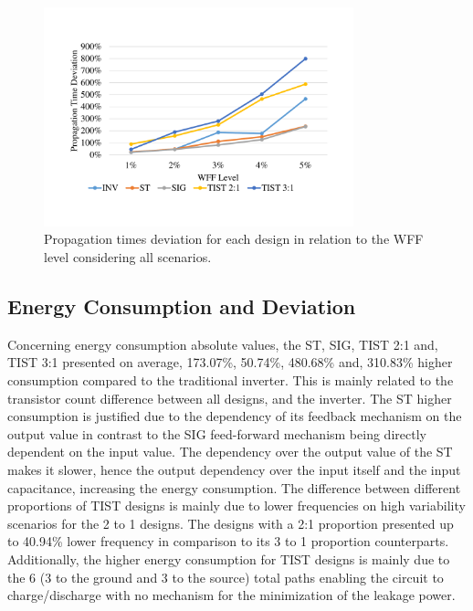 \documentclass[pgmicro,mestrado,english]{iiufrgs}
\begin{document}
\begin{figure}[h]
	\centering
		\includegraphics[width=0.8\textwidth, trim={2cm 3cm 2cm 3cm}, clip]{delayDevWFF.pdf}
		\caption{Propagation times deviation for each design in relation to the WFF level considering all scenarios.}
	\label{fig:delaysDev}
\end{figure}

\subsection{Energy Consumption and Deviation}
    Concerning energy consumption absolute values, the ST, SIG, TIST 2:1 and, TIST 3:1 presented on average, 173.07\%, 50.74\%, 480.68\% and, 310.83\% higher consumption compared to the traditional inverter. This is mainly related to the transistor count difference between all designs, and the inverter. The ST higher consumption is justified due to the dependency of its feedback mechanism on the output value in contrast to the SIG feed-forward mechanism being directly dependent on the input value. The dependency over the output value of the ST makes it slower, hence the output dependency over the input itself and the input capacitance, increasing the energy consumption. The difference between different proportions of TIST designs is mainly due to lower frequencies on high variability scenarios for the 2 to 1 designs. The designs with a 2:1 proportion presented up to 40.94\% lower frequency in comparison to its 3 to 1 proportion counterparts. Additionally, the higher energy consumption for TIST designs is mainly due to the 6 (3 to the ground and 3 to the source) total paths enabling the circuit to charge/discharge with no mechanism for the minimization of the leakage power.
\end{document}
